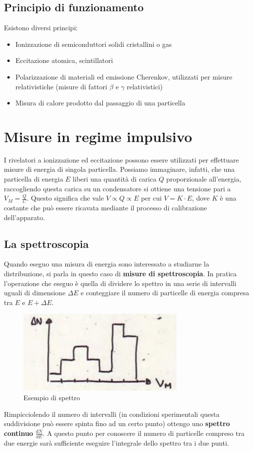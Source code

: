 \subsection{Principio di funzionamento}
Esistono diversi principi:
\begin{itemize}
\item Ionizzazione di semiconduttori solidi cristallini o gas
\item Eccitazione atomica, scintillatori
\item Polarizzazione di materiali ed emissione Cherenkov, utilizzati per misure relativistiche (misure di fattori $\beta$ e $\gamma$ relativistici)
\item Misura di calore prodotto dal passaggio di una particella
\end{itemize}
\section{Misure in regime impulsivo}
I rivelatori a ionizzazione ed eccitazione possono essere utilizzati per effettuare misure di energia di singola particella.
Possiamo immaginare, infatti, che una particella di energia $E$ liberi una quantit\`a di carica $Q$ proporzionale all'energia,
raccogliendo questa carica su un condensatore si ottiene una tensione pari a $V_M = \frac{Q}{C}$.
Questo significa che vale $V \propto Q \propto E$ per cui $V = K \cdot E$, dove $K$ \`e una costante che pu\`o essere ricavata mediante il processo di calibrazione 
dell'apparato.
\subsection{La spettroscopia}
Quando eseguo una misura di energia sono interessato a studiarne la distribuzione, si parla in questo caso di \textbf{misure di spettroscopia}.
In pratica l'operazione che eseguo \`e quella di dividere lo spettro in una serie di intervalli uguali di dimensione $\Delta E$ e conteggiare il numero di particelle
di energia compresa tra $E$ e $E + \Delta E$.
\begin{figure}[htb]
\begin{center}
	\includegraphics[scale=1]{./Immagini/Spettroscopia.png}
\caption{Esempio di spettro}
\end{center}
\end{figure}
Rimpicciolendo il numero di intervalli (in condizioni sperimentali questa suddivisione pu\`o essere spinta fino ad un certo punto) ottengo uno \textbf{spettro continuo} $\frac{dN}{dE}$.
A questo punto per conoscere il numero di particelle compreso tra due energie sar\`a sufficiente eseguire l'integrale dello spettro tra i due punti.
